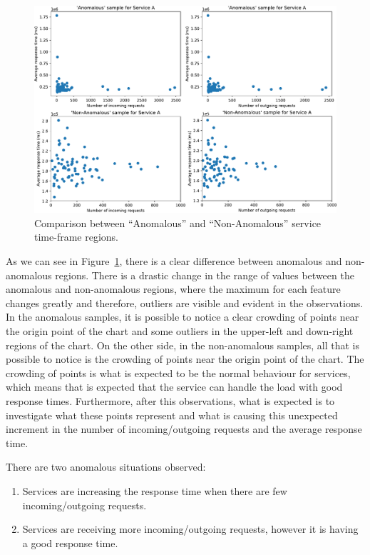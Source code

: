 \begin{figure}[H]
  \centering\includegraphics[width=1.0\linewidth]{images/result_samples_for_service_a_cc.pdf}
  \captionsetup{justification=centering}
  \caption{Comparison between ``Anomalous'' and ``Non-Anomalous'' service time-frame regions.}
  \label{fig:comparison_anomalous_non_anomalous_regions}
\end{figure}

As we can see in Figure~\ref{fig:comparison_anomalous_non_anomalous_regions}, there is a clear difference between anomalous and non-anomalous regions. There is a drastic change in the range of values between the anomalous and non-anomalous regions, where the maximum for each feature changes greatly and therefore, outliers are visible and evident in the observations. In the anomalous samples, it is possible to notice a clear crowding of points near the origin point of the chart and some outliers in the upper-left and down-right regions of the chart. On the other side, in the non-anomalous samples, all that is possible to notice is the crowding of points near the origin point of the chart. The crowding of points is what is expected to be the normal behaviour for services, which means that is expected that the service can handle the load with good response times. Furthermore, after this observations, what is expected is to investigate what these points represent and what is causing this unexpected increment in the number of incoming/outgoing requests and the average response time.

There are two anomalous situations observed:

\begin{enumerate}
  \item Services are increasing the response time when there are few incoming/outgoing requests.
  \item Services are receiving more incoming/outgoing requests, however it is having a good response time.
\end{enumerate}

